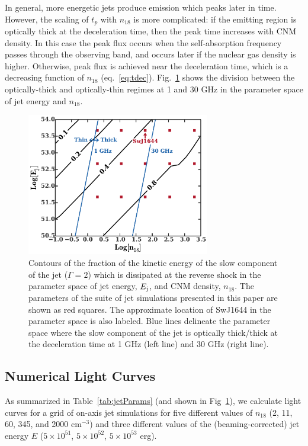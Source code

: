 \documentclass[usenatbib,fleqn]{mnras}
\begin{document}
In general, more energetic jets produce emission which
peaks later in time.  However, the scaling of $t_p$ with $n_{18}$ is
more complicated: if the emitting region is optically thick at the
deceleration time, then the peak time increases with CNM density. In this
case the peak flux occurs when the self-absorption frequency passes through
the observing band, and occurs later if the nuclear gas density is
higher. Otherwise, peak flux is achieved near the deceleration time,
which is a decreasing function of $n_{18}$ (eq.~\ref{eq:tdec}).
Fig.~\ref{fig:diss} shows the division between the optically-thick and
optically-thin regimes at 1 and 30 GHz in the parameter space of jet energy and $n_{18}$.

\begin{figure}
\includegraphics[width=8cm]{diss.pdf}
\caption{\label{fig:diss} Contours of the fraction of the kinetic
  energy of the slow component of the jet ($\Gamma=2$) which is
  dissipated at the reverse shock in the parameter space of jet
  energy, $E_{\rm j}$, and CNM density, $n_{18}$.  The parameters of
  the suite of jet simulations presented in this paper are shown as
  red squares. The approximate location of SwJ1644 in the parameter
  space is also labeled.  Blue lines delineate the parameter space
  where the slow component of the jet is optically thick/thick at the
  deceleration time at 1 GHz (left line) and 30 GHz (right line).}
\end{figure}


\subsection{Numerical Light Curves}
\label{sec:numResults}
As summarized in Table~\ref{tab:jetParams} (and shown in
Fig~\ref{fig:diss}), we calculate light curves for a grid of on-axis
jet simulations for five different values of $n_{18}$ (2, 11, 60, 345,
and 2000 cm$^{-3}$) and three different values of the
(beaming-corrected) jet energy $E$ ($5\times 10^{51}$, $5\times
10^{52}$, $5\times 10^{53}$ erg).
\end{document}
